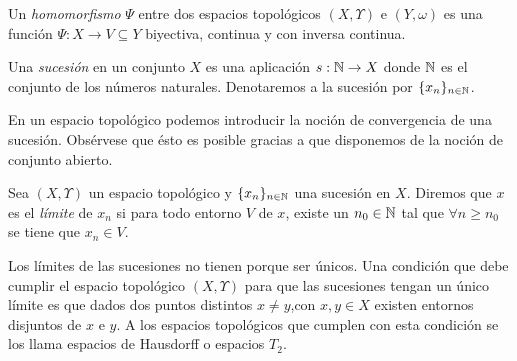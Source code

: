 \begin{definicion}[Homomorfismo]
  Un {\it homomorfismo} $\Psi$ entre dos espacios topol\'ogicos $(X,\Upsilon)$ e
  $(Y,\omega)$ es una funci\'on $\Psi: X \rightarrow V \subseteq Y$
  biyectiva, continua y con inversa continua.
\end{definicion}

\begin{definicion}[Sucesi\'on]
  Una  {\it  sucesi\'on}  en un  conjunto  $X$  es  una aplicaci\'on  $s:  \mathbb{N}
  \rightarrow   X$   donde   $\mathbb{N}$   es   el   conjunto   de   los   n\'umeros
  naturales. Denotaremos a la sucesi\'on por $\{ x_n \}_{n \in \mathbb{N}}$.
\end{definicion}

En un espacio topol\'ogico podemos introducir la noci\'on de convergencia de una
sucesi\'on. Obs\'ervese  que \'esto  es posible gracias  a que disponemos  de la
noci\'on de conjunto abierto.

\begin{definicion}[L\'imite]
  Sea $(X,  \Upsilon)$ un espacio topol\'ogico  y $\{ x_n \}_{n  \in \mathbb{N}}$ una
  sucesi\'on en $X$. Diremos que $x$ es  el {\it l\'imite} de $x_n$ si para todo
  entorno $V$ de $x$,  existe un $n_0 \in \mathbb{N}$ tal que  $\forall n \ge n_0$ se
  tiene que $x_n \in V$.
\end{definicion}

Los l\'imites de  las sucesiones no tienen porque  ser \'unicos. Una condici\'on
que debe cumplir el espacio  topol\'ogico $(X,\Upsilon)$ para que las sucesiones
tengan un \'unico l\'imite es que  dados dos puntos distintos $x \ne y$,con $x,y
\in X$ existen entornos disjuntos de $x$ e $y$. A los espacios topol\'ogicos que
cumplen  con esta  condici\'on se  los llama  espacios de  Hausdorff  o espacios
$T_2$.
